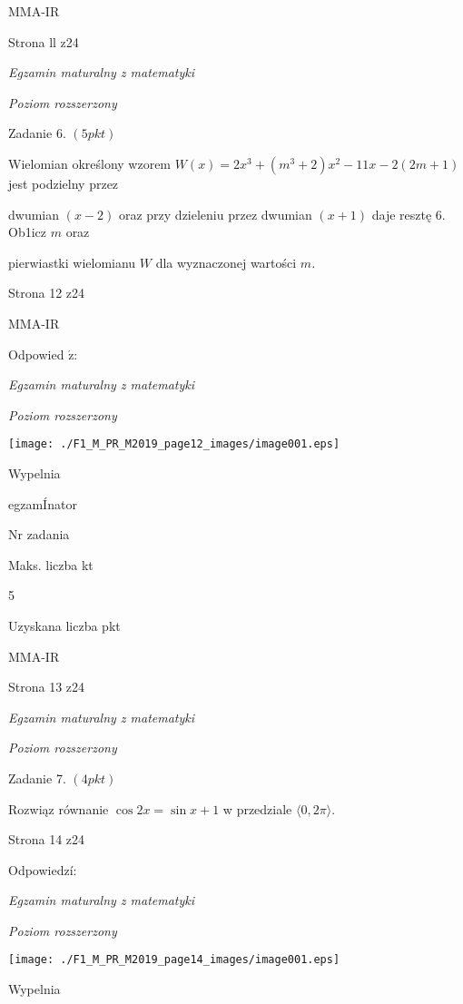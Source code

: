 \documentclass[a4paper,12pt]{article}
\begin{document}
MMA-IR

Strona ll z24





{\it Egzamin maturalny z matematyki}

{\it Poziom rozszerzony}

Zadanie 6. $(5pkt)$

Wielomian określony wzorem $W(x)=2x^{3}+(m^{3}+2)x^{2}-11x-2(2m+1)$ jest podzielny przez

dwumian $(x-2)$ oraz przy dzieleniu przez dwumian $(x+1)$ daje resztę 6. Ob1icz $m$ oraz

pierwiastki wielomianu $W$ dla wyznaczonej wartości $m.$

Strona 12 z24

MMA-IR





Odpowied $\acute{\mathrm{z}}$:

{\it Egzamin maturalny z matematyki}

{\it Poziom rozszerzony}
\begin{center}
\texttt{[image: ./F1\_M\_PR\_M2019\_page12\_images/image001.eps]}
\end{center}
Wypelnia

egzamÍnator

Nr zadania

Maks. liczba kt

5

Uzyskana liczba pkt

MMA-IR

Strona 13 z24





{\it Egzamin maturalny z matematyki}

{\it Poziom rozszerzony}

Zadanie 7. $(4pkt)$

Rozwiąz równanie $\cos 2x=\sin x+1$ w przedziale $\langle 0,2\pi\rangle.$

Strona 14 z24





Odpowiedzí:

{\it Egzamin maturalny z matematyki}

{\it Poziom rozszerzony}
\begin{center}
\texttt{[image: ./F1\_M\_PR\_M2019\_page14\_images/image001.eps]}
\end{center}
Wypelnia
\end{document}
